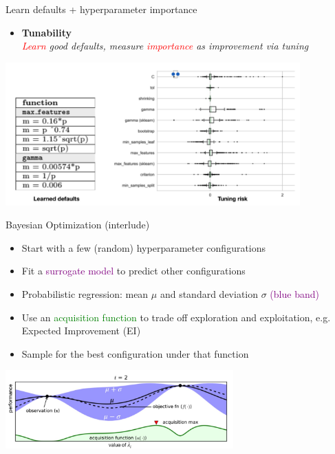 \begin{frame}{Learn defaults + hyperparameter importance}

\begin{itemize}
    \item \textbf{Tunability} \\\textit{\textcolor{red}{Learn} good defaults, measure \textcolor{red}{importance} as improvement via tuning}
\end{itemize}
\centering\includegraphics[height=5.5cm]{image/img201428.jpg}


\end{frame}
\begin{frame}{Bayesian Optimization (interlude)}
\begin{itemize}
    \item Start with a few (random) hyperparameter configurations
    \item Fit a \textcolor{purple}{surrogate model}  to predict other configurations
    \item Probabilistic regression: mean $\mu$ and standard deviation $\sigma$ \textcolor{purple}{(blue band)}
    \item Use an \textcolor{green}{acquisition function }to trade off exploration and exploitation, e.g. Expected Improvement (EI)
    \item Sample for the best configuration under that function
\end{itemize}
\centering\includegraphics[height=3cm]{image/img201705.jpg}


\end{frame}

